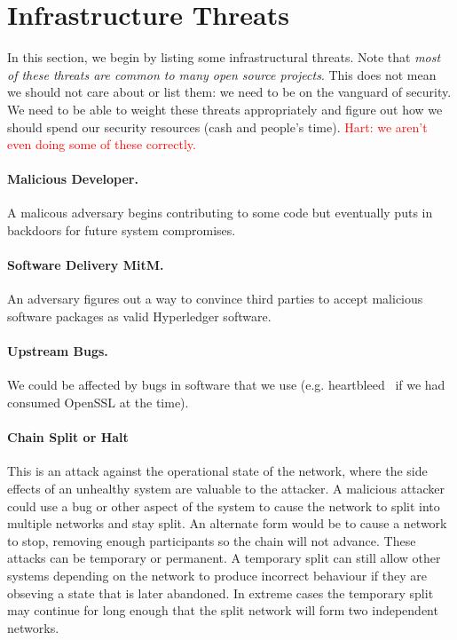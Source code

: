 
\section{Infrastructure Threats}

In this section, we begin by listing some infrastructural threats.  Note that \emph{most of these threats are common to many open source projects}.  This does not mean we should not care about or list them:  we need to be on the vanguard of security.  We need to be able to weight these threats appropriately and figure out how we should spend our security resources (cash and people's time). \textcolor{red}{Hart: we aren't even doing some of these correctly.}

\paragraph{Malicious Developer.}  A malicous adversary begins contributing to some code but eventually puts in backdoors for future system compromises.

\paragraph{Software Delivery MitM.}  An adversary figures out a way to convince third parties to accept malicious software packages as valid Hyperledger software.

\paragraph{Upstream Bugs.}  We could be affected by bugs in software that we use (e.g. heartbleed~\cite{durumeric2014matter} if we had consumed OpenSSL at the time).

\paragraph{Chain Split or Halt}  This is an attack against the operational state of the network, where the side effects of an unhealthy system are valuable to the attacker.
A malicious attacker could use a bug or other aspect of the system to cause the network to split into multiple networks and stay split.
An alternate form would be to cause a network to stop, removing enough participants so the chain will not advance.
These attacks can be temporary or permanent.
A temporary split can still allow other systems depending on the network to produce incorrect behaviour if they are obseving a state that is later abandoned.
In extreme cases the temporary split may continue for long enough that the split network will form two independent networks.
